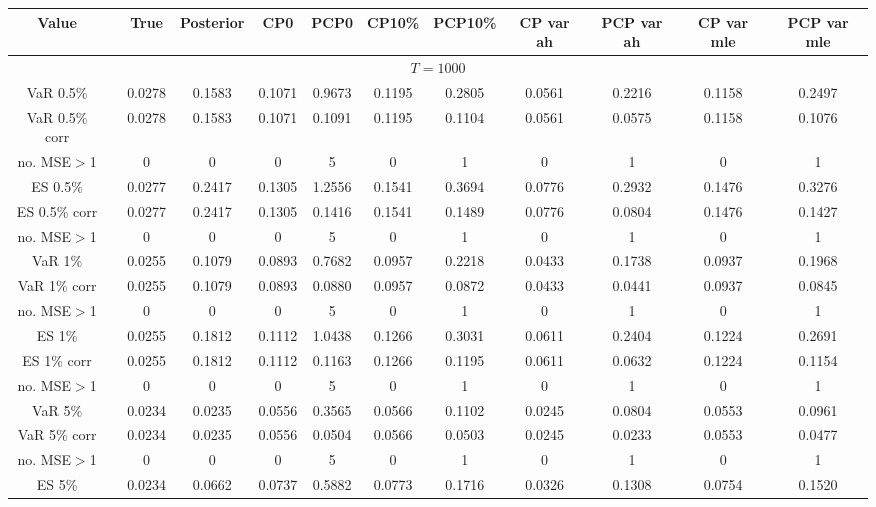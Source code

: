 { \tiny 
{ \renewcommand{\arraystretch}{1.1} 
\begin{sidewaystable} 
\center 
\begin{tabular}{cc cc | cccc | cccc} 
Value && True & Posterior & CP0  & PCP0 & CP10\%  & PCP10\% &CP var ah & PCP var ah & CP var mle & PCP var mle \\ \hline 
\hline 
\multicolumn{12}{c}{$T =1000$}  \\ 
\hline 
VaR 0.5\% && 0.0278 & 0.1583 & 0.1071 & 0.9673 & 0.1195 & 0.2805 &0.0561 & 0.2216 & 0.1158 & 0.2497 \\ 
VaR 0.5\% corr && 0.0278 & 0.1583 & 0.1071 & 0.1091 & 0.1195 & 0.1104 &0.0561 & 0.0575 & 0.1158 & 0.1076 \\ 
no. MSE$>$1 && 0 & 0 & 0 & 5 & 0 & 1 &0 & 1 & 0 & 1 \\[1ex] 
ES 0.5\% && 0.0277 & 0.2417 & 0.1305 & 1.2556 & 0.1541 & 0.3694 &0.0776 & 0.2932 & 0.1476 & 0.3276 \\ 
ES 0.5\% corr && 0.0277 & 0.2417 & 0.1305 & 0.1416 & 0.1541 & 0.1489 &0.0776 & 0.0804 & 0.1476 & 0.1427 \\ 
no. MSE$>$1 && 0 & 0 & 0 & 5 & 0 & 1 &0 & 1 & 0 & 1 \\[1.5ex]  
 \rowcolor{LightCyan} 
VaR 1\% && 0.0255 & 0.1079 & 0.0893 & 0.7682 & 0.0957 & 0.2218 &0.0433 & 0.1738 & 0.0937 & 0.1968 \\  
 \rowcolor{LightCyan} 
VaR 1\% corr && 0.0255 & 0.1079 & 0.0893 & 0.0880 & 0.0957 & 0.0872 &0.0433 & 0.0441 & 0.0937 & 0.0845 \\ 
 \rowcolor{LightCyan} 
no. MSE$>$1 && 0 & 0 & 0 & 5 & 0 & 1 &0 & 1 & 0 & 1 \\[1ex] 
 \rowcolor{LightCyan} 
ES 1\% && 0.0255 & 0.1812 & 0.1112 & 1.0438 & 0.1266 & 0.3031 &0.0611 & 0.2404 & 0.1224 & 0.2691 \\ 
 \rowcolor{LightCyan} 
ES 1\% corr && 0.0255 & 0.1812 & 0.1112 & 0.1163 & 0.1266 & 0.1195 &0.0611 & 0.0632 & 0.1224 & 0.1154 \\ 
 \rowcolor{LightCyan} 
no. MSE$>$1 && 0 & 0 & 0 & 5 & 0 & 1 &0 & 1 & 0 & 1 \\[1.5ex] 
VaR 5\% && 0.0234 & 0.0235 & 0.0556 & 0.3565 & 0.0566 & 0.1102 &0.0245 & 0.0804 & 0.0553 & 0.0961 \\ 
VaR 5\% corr && 0.0234 & 0.0235 & 0.0556 & 0.0504 & 0.0566 & 0.0503 &0.0245 & 0.0233 & 0.0553 & 0.0477 \\ 
no. MSE$>$1 && 0 & 0 & 0 & 5 & 0 & 1 &0 & 1 & 0 & 1 \\[1ex] 
ES 5\% && 0.0234 & 0.0662 & 0.0737 & 0.5882 & 0.0773 & 0.1716 &0.0326 & 0.1308 & 0.0754 & 0.1520 \\ 

\end{tabular}
\end{sidewaystable}}}

